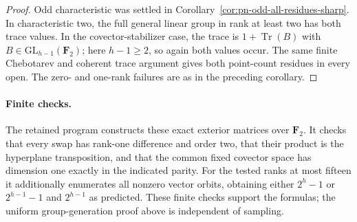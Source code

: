 \begin{proof}
Odd characteristic was settled in
Corollary~\ref{cor:pn-odd-all-residues-sharp}.  In characteristic
two, the full general linear group in rank at least two
has both trace values.  In the covector-stabilizer case,
the trace is $1+\operatorname{Tr}(B)$ with
$B\in\mathrm{GL}_{h-1}(\mathbf F_2)$; here $h-1\geq2$,
so again both values occur.  The same finite Chebotarev
and coherent trace argument gives both point-count
residues in every open.  The zero- and one-rank failures
are as in the preceding corollary.
\end{proof}

\paragraph{Finite checks.}
The retained program
 constructs
these exact exterior matrices over $\mathbf F_2$.
It checks that every swap has rank-one difference and
order two, that their product is the hyperplane
transposition, and that the common fixed covector space
has dimension one exactly in the indicated parity.
For the tested ranks at most fifteen it additionally
enumerates all nonzero vector orbits, obtaining either
$2^h-1$ or $2^{h-1}-1$ and $2^{h-1}$ as predicted.
These finite checks support the formulas; the uniform
group-generation proof above is independent of sampling.
